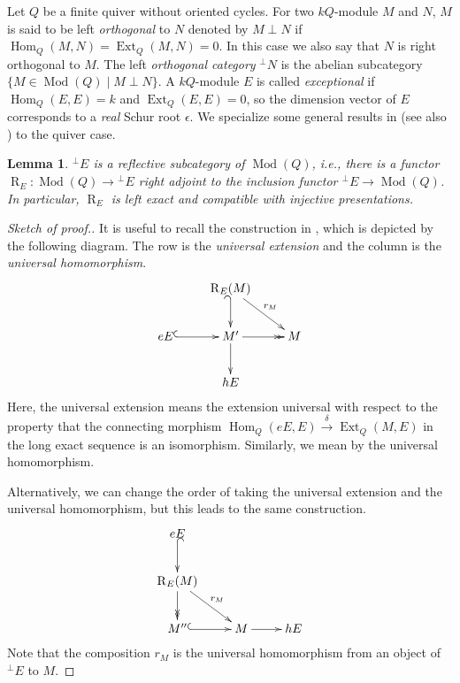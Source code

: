 \documentclass{amsart}
\newtheorem{lemma}[theorem]{Lemma}
\theoremstyle{definition}
\theoremstyle{remark}
\numberwithin{equation}{section}
\begin{document}
Let $Q$ be a finite quiver without oriented cycles. For two $kQ$-module $M$ and $N$, $M$ is said to be left {\em orthogonal} to $N$ denoted by $M\perp N$ if ${\operatorname{Hom}}_Q(M,N)={\operatorname{Ext}}_Q(M,N)=0$. In this case we also say that $N$ is right orthogonal to $M$. The left {\em orthogonal category} ${{^\perp}\!} N$ is the abelian subcategory $\{M\in{\operatorname{Mod}}(Q)\mid M\perp N\}$. A $kQ$-module $E$ is called {\em exceptional} if ${\operatorname{Hom}}_Q(E,E)=k$ and ${\operatorname{Ext}}_Q(E,E)=0$, so the dimension vector of $E$ corresponds to a {\em real} Schur root $\epsilon$.
We specialize some general results in \cite{GL} (see also \cite{S1}) to the quiver case.

\begin{lemma} \cite[Proposition 3.2, 3.5]{GL} \label{L:OP} $^\perp E$ is a reflective subcategory of ${\operatorname{Mod}}(Q)$, i.e.,
there is a functor ${\operatorname{R}}_E:{\operatorname{Mod}}(Q)\to{{^\perp}\!} E$ right adjoint to the inclusion functor
$^\perp E\to{\operatorname{Mod}}(Q)$. In particular, ${\operatorname{R}}_E$ is left exact and compatible with injective
presentations.
\end{lemma}

\begin{proof}[Sketch of proof.] It is useful to recall the construction in \cite{GL}, which is depicted by the following diagram. The row is the {\em universal extension} and the column is the {\em universal homomorphism}.
$$\xymatrix{
& {\operatorname{R}}_E(M) \ar@{_{(}->}[d] \ar[dr]^{r_M} & \\
eE \ar@{^{(}->}[r] & M' \ar[d] \ar@{->>}[r] & M\\
& hE &
}$$
Here, the universal extension means the extension universal with respect to the property that the connecting morphism ${\operatorname{Hom}}_Q(eE,E)\xrightarrow{\delta}{\operatorname{Ext}}_Q(M,E)$ in the long exact sequence is an isomorphism. Similarly, we mean by the universal homomorphism.

Alternatively, we can change the order of taking the universal extension and the universal homomorphism, but this leads to the same construction.
$$\xymatrix{
eE \ar@{^{(}->}[d] &  &  \\
{\operatorname{R}}_E(M) \ar@{->>}[d] \ar[dr]^{r_M} & &  \\
M'' \ar@{^{(}->}[r] & M \ar[r] & hE
}$$
Note that the composition $r_M$ is the universal homomorphism from an object of $^\perp E$ to $M$.
\end{proof}
\end{document}
